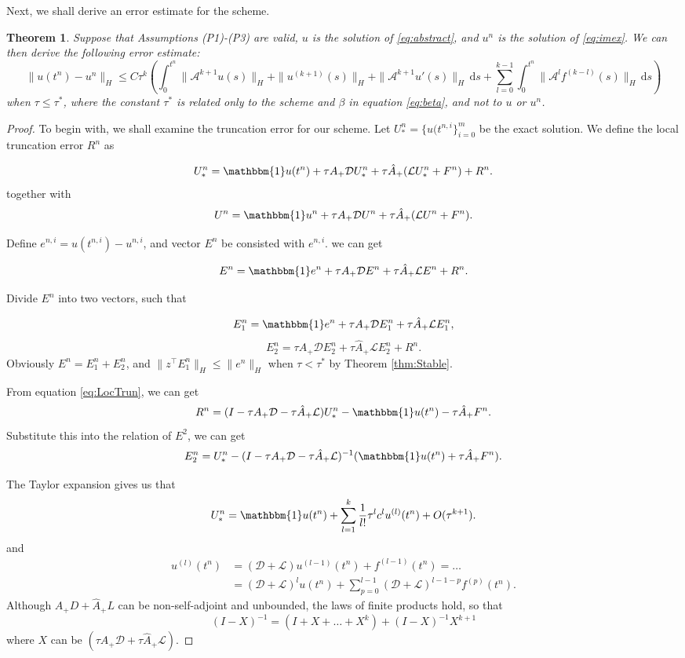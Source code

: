 \documentclass[a4paper, oneside]{book}
\def\calA{{\mathcal{A}}}
\def\bbone{{\mathbbm{1}}}
\def\hatA{{\hat{A}}}
\def\calA{{\mathcal{A}}}
\def\calD{{\mathcal{D}}}
\def\calL{{\mathcal{L}}}
\def\As{{A_+}}
\def\Ahs{{\hatA_+}}
\newtheorem{theorem}{Theorem}[section]
\begin{document}
Next, we shall derive an error estimate for the scheme. 
\begin{theorem}
Suppose that Assumptions (P1)-(P3) are valid, $u$ is the solution of \ref{eq:abstract}, and $u^n$ is the solution of \ref{eq:imex}. We can then derive the following error estimate:
$$
\|u(t^n) - u^n\|_H \leq C\tau^k \left(\int_{0}^{t^{n}}\|\calA^{k+1}u(s)\|_H + \|u^{(k+1)}(s)\|_H + \|\calA^{k+1}u'(s)\|_H \, \mathrm{d}s   
+  \sum_{l=0}^{k-1} \int_{0}^{t^{n}}\|\calA^lf^{(k-l)}(s)\|_H \, \mathrm{d}s \right)
$$
when $\tau \leq \tau^*$, where the constant $\tau^*$ is related only to the scheme and $\beta$ in equation \eqref{eq:beta}, and not to $u$ or $u^n$.    
\end{theorem}
\begin{proof}To begin with, we shall examine the truncation error for our scheme. 
Let $U_*^n = \{u(t^{n,i}\}_{i=0}^{m}$ be the exact solution. 
We define the local truncation error $R^n$ as 


\begin{equation}\label{eq:LocTrun}
U_*^n = \bbone u(t^n) + \tau \As \calD U_*^n + \tau \Ahs (\calL U_*^n + F^n) + R^n. 
\end{equation}
together with 
\begin{equation}
U^n = \bbone u^n + \tau \As \calD U^n + \tau \Ahs (\calL U^n + F^n). 
\end{equation}

Define $e^{n,i} = u(t^{n,i}) - u^{n,i}$, and vector $E^n$ be consisted with $e^{n,i}$. we can get

$$E^n = \bbone e^n + \tau \As \calD E^n + \tau \Ahs \calL E^n + R^n. $$

Divide $E^n$ into two vectors, such that 

$$E_1^n = \bbone e^n + \tau \As \calD E_1^n + \tau\Ahs \calL E_1^n, $$
$$E_2^n =  \tau \As \calD E_2^n + \tau\Ahs \calL E_2^n + R^n.$$
Obviously $E^n = E_1^n + E_2^n$, and 
$\|z^\top E_1^n \|_H \leq \|e^n\|_H$ {when $\tau<\tau^*$ by Theorem \ref{thm:Stable}}. 

From equation \eqref{eq:LocTrun}, we can get
$$R^n = (I - \tau \As \calD - \tau \Ahs \calL) U_*^n - \bbone u(t^n) - \tau \Ahs F^n.$$
Substitute this into the relation of $E^2$, we can get
$$E_2^n = U_*^n - (I - \tau \As \calD - \tau \Ahs \calL)^{-1} (\bbone u(t^n) + \tau \Ahs F^n).$$

The Taylor expansion gives us that
$$U_*^n = \bbone u(t^n) + \sum_{l=1}^{k} \frac{1}{l!}\tau^l c^l u^{(l)}(t^n) + O(\tau^{k+1}).$$
and 
\begin{align*}u^{(l)}(t^n) &= (\calD+\calL)u^{(l-1)}(t^n) + f^{(l-1)}(t^n) = \dots \\
    &= (\calD+\calL)^lu(t^n) + \sum_{p=0}^{l-1} (\calD+\calL)^{l-1-p}f^{(p)}(t^n). 
\end{align*}
Although $\As D + \Ahs L$ can be non-self-adjoint and unbounded, the laws of finite products hold, so that
$$(I-X)^{-1} = (I+X+\dots+X^k) + (I-X)^{-1}X^{k+1}$$
where $X$ can be $(\tau \As \calD + \tau \Ahs \calL)$.


\end{proof}
\end{document}

